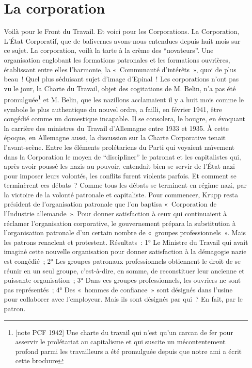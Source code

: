 \documentclass[french,twoside]{book} %
\begin{document}
\section[{La corporation}]{La corporation}
\noindent Voilà pour le Front du Travail. Et voici pour les Corporations. La Corporation, L’État Corporatif, que de balivernes avons-nous entendues depuis huit mois sur ce sujet. La corporation, voilà la tarte à la crème des “novateurs”. Une organisation englobant les formations patronales et les formations ouvrières, établissant entre elles l’harmonie, la « Communauté d’intérêts », quoi de plus beau ! Quel plus séduisant sujet d’image d’Epinal ! Les corporations n’ont pas vu le jour, la Charte du Travail, objet des cogitations de M. Belin, n’a pas été promulguée\footnote{[note PCF 1942] Une charte du travail qui n’est qu’un carcan de fer pour asservir le prolétariat au capitalisme et qui suscite un mécontentement profond parmi les travailleurs a été promulguée depuis que notre ami a écrit cette brochure} et M. Belin, que les nazillons acclamaient il y a huit mois comme le symbole le plus authentique du nouvel ordre, a failli, en février 1941, être congédié comme un domestique incapable. Il se consolera, le bougre, en évoquant la carrière des ministres du Travail d’Allemagne entre 1933 et 1935. À cette époque, en Allemagne aussi, la discussion sur la Charte Corporative tenait l’avant-scène. Entre les éléments prolétariens du Parti qui voyaient naïvement dans la Corporation le moyen de “discipliner” le patronat et les capitalistes qui, après avoir poussé les nazis au pouvoir, entendait bien se servir de l’État nazi pour imposer leurs volontés, les conflits furent violents parfois. Et comment se terminèrent ces débats ? Comme tous les débats se terminent en régime nazi, par la victoire de la volonté patronale et capitaliste. Pour commencer, Krupp resta président de l’organisation patronale que l’on baptisa « Corporation de l’Industrie allemande ». Pour donner satisfaction à ceux qui continuaient à réclamer l’organisation corporative, le gouvernement prépara la substitution à l’organisation patronale d’un certain nombre de « groupes professionnels ». Mais les patrons renaclent et protestent. Résultats : 1° Le Ministre du Travail qui avait imaginé cette nouvelle organisation pour donner satisfaction à la démagogie nazie est congédié ; 2° Les groupes patronaux professionnels obtiennent le droit de se réunir en un seul groupe, c’est-à-dire, en somme, de reconstituer leur ancienne et puissante organisation ; 3° Dans ces groupes professionnels, les ouvriers ne sont pas représentés ; 4° Des « hommes de confiance » sont désignés dans l’usine pour collaborer avec l’employeur. Mais ils sont désignés par qui ? En fait, par le patron.
\end{document}
